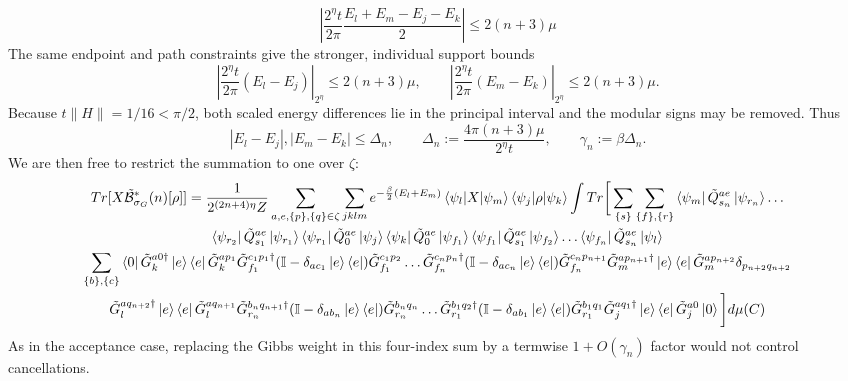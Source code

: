 \documentclass[aps,floatfix,10pt,amssymb,amsfont,amsmath,superscriptaddress,float,nofootinbib,longbibliography,nobalancelastpage,twocolumn]{revtex4-2}
\begin{document}
\begin{widetext}
\begin{equation}
\label{eq:energiessame}
    \left|\frac{2^{\eta}t}{2\pi}\frac{E_l+E_m-E_j-E_k}{2}\right| \leq 2(n+3)\mu
\end{equation}
The same endpoint and path constraints give the stronger, individual
support bounds
\begin{equation}
 \left|\frac{2^\eta t}{2\pi}(E_l-E_j)\right|_{2^\eta}\leq2(n+3)\mu,
 \qquad
 \left|\frac{2^\eta t}{2\pi}(E_m-E_k)\right|_{2^\eta}\leq2(n+3)\mu .
 \label{eq:B_individual_support_modular}
\end{equation}
Because $t\|H\|=1/16<\pi/2$, both scaled energy differences lie in the
principal interval and the modular signs may be removed.  Thus
\begin{equation}
 |E_l-E_j|,|E_m-E_k|\leq\Delta_n,\qquad
 \Delta_n:=\frac{4\pi(n+3)\mu}{2^\eta t},\qquad
 \gamma_n:=\beta\Delta_n .
 \label{eq:B_gamma_n}
\end{equation}
We are then free to restrict the summation to one over $\zeta$:
\begin{multline}
    Tr[X\tilde{\mathcal{B}}^*_{\sigma_G}(n)[\rho]] = \frac{1}{2^{(2n+4)\eta}Z}\sum_{a,e, \{p\}, \{q\}\in \zeta}
    \sum_{jklm}e^{-\frac{\beta}{2}(E_l+E_m)}\braket{\psi_l|X|\psi_m}\braket{\psi_j|\rho|\psi_k}\int Tr\bigg[ \sum_{\{s\}}\sum_{\{f\}, \{r\}}\bra{\psi_m}\tilde Q^{ae}_{s_n}\ket{\psi_{r_{n}}}\ldots \\\bra{\psi_{r_2}}\tilde Q^{ae}_{s_1}\ket{\psi_{r_1}}\bra{\psi_{r_1}}\tilde Q^{ae}_0\ket{\psi_j}
\bra{\psi_k}\tilde Q^{ae}_0\ket{\psi_{f_1}}\bra{\psi_{f_1}}\tilde Q^{ae}_{s_1}\ket{\psi_{f_2}}\ldots \bra{\psi_{f_{n}}}\tilde Q^{ae}_{s_n}\ket{\psi_l}\\
\sum_{\{b\}, \{c\}}
\bra{0}\tilde G^{a0\dagger}_k\ket{e}\bra{e}\tilde G^{ap_1}_k\tilde G^{c_1p_1\dagger}_{f_1}(\mathbb{I} - \delta_{ac_1}\ket{e}\bra{e})\tilde G^{c_1p_2}_{f_1}\ldots \tilde G^{c_np_n\dagger}_{f_n}(\mathbb{I} - \delta_{ac_n}\ket{e}\bra{e})\tilde G^{c_np_{n+1}}_{f_n}\tilde G^{ap_{n+1}\dagger}_{m}\ket{e}\bra{e}\tilde G^{ap_{n+2}}_m \delta_{p_{n+2}q_{n+2}}\\\tilde G^{aq_{n+2}\dagger}_l \ket{e}\bra{e}\tilde G^{aq_{n+1}}_l \tilde G^{b_{n}q_{n+1}\dagger}_{r_n}(\mathbb{I} - \delta_{ab_n}\ket{e}\bra{e})\tilde G^{b_nq_n}_{r_n}\ldots \tilde G^{b_1q_2\dagger}_{r_1}(\mathbb{I} - \delta_{ab_1}\ket{e}\bra{e})\tilde G^{b_1q_1}_{r_1}\tilde G^{aq_1\dagger}_j\ket{e}\bra{e}\tilde G^{a0}_j\ket{0}\bigg]d\mu(C) 
\end{multline}
As in the acceptance case, replacing the Gibbs weight in this four-index
sum by a termwise $1+O(\gamma_n)$ factor would not control cancellations.

\end{widetext}
\end{document}
